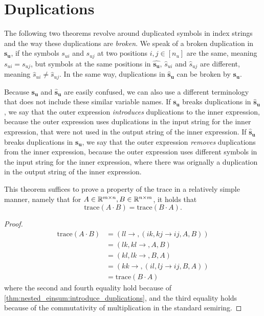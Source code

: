 \section{Duplications}

The following two theorems revolve around duplicated symbols in index strings and the way these duplications are \textit{broken}.
We speak of a broken duplication in $\bm{s_u}$, if the symbols $s_{ui}$ and $s_{uj}$ at two positions $i,j \in [n_u]$ are the same, meaning $s_{ui} = s_{uj}$,
but symbols at the same positions in $\bm{\hat{s_u}}$, $\hat{s}_{ui}$ and $\hat{s}_{uj}$ are different, meaning $\hat{s}_{ui} \neq \hat{s}_{uj}$.
In the same way, duplications in $\bm{\hat{s}_u}$ can be broken by $\bm{s_u}$.

Because $\bm{s_u}$ and $\bm{\hat{s}_u}$ are easily confused, we can also use a different terminology that does not include these similar variable names.
If $\bm{s_u}$ breaks duplications in $\bm{\hat{s}_u}$, we say that the outer expression \textit{introduces} duplications to the inner expression,
because the outer expression uses duplications in the input string for the inner expression, that were not used in the output string of the inner expression.
If $\bm{\hat{s}_u}$ breaks duplications in $\bm{s_u}$, we say that the outer expression \textit{removes} duplications from the inner expression,
because the outer expression uses different symbols in the input string for the inner expression, where there was orignally a duplication in the output string of the inner expression.



This theorem suffices to prove a property of the trace in a relatively simple manner, namely that for $A \in \mathbb{R}^{m \times n}, B \in \mathbb{R}^{n \times m}$,
it holds that
$$\text{trace}(A \cdot B) = \text{trace}(B \cdot A).$$

\begin{proof}
    \small
    \begin{align*}
        \text{trace}(A \cdot B) & = (ll \rightarrow , (ik,kj \rightarrow ij, A, B))  \\
                                & = (lk, kl \rightarrow ,A, B)                       \\
                                & = (kl, lk \rightarrow ,B, A)                       \\
                                & = (kk \rightarrow , (il, lj \rightarrow ij, B, A)) \\
                                & = \text{trace}(B \cdot A)
    \end{align*}
    where the second and fourth equality hold because of \cref{thm:nested_einsum:introduce_duplications},
    and the third equality holds because of the commutativity of multiplication in the standard semiring.
\end{proof}
\bigskip

